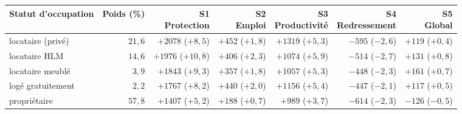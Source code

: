 \begin{tabular}{p{4.2cm}rrrrrr}\toprule Statut d'occupation & Poids (\%) & \makecell{S1\\Protection} & \makecell{S2\\Emploi} & \makecell{S3\\Productivité} & \makecell{S4\\Redressement} & \makecell{S5\\Global}\\ \midrule
locataire (privé) & $21{,}6$ & $+2078$ ($+8{,}5$) & $+452$ ($+1{,}8$) & $+1319$ ($+5{,}3$) & $-595$ ($-2{,}6$) & $+119$ ($+0{,}4$)\\
locataire HLM & $14{,}6$ & $+1976$ ($+10{,}8$) & $+406$ ($+2{,}3$) & $+1074$ ($+5{,}9$) & $-514$ ($-2{,}7$) & $+131$ ($+0{,}8$)\\
locataire meublé & $3{,}9$ & $+1843$ ($+9{,}3$) & $+357$ ($+1{,}8$) & $+1057$ ($+5{,}3$) & $-448$ ($-2{,}3$) & $+161$ ($+0{,}7$)\\
logé gratuitement & $2{,}2$ & $+1767$ ($+8{,}2$) & $+440$ ($+2{,}0$) & $+1156$ ($+5{,}4$) & $-447$ ($-2{,}1$) & $+117$ ($+0{,}5$)\\
propriétaire & $57{,}8$ & $+1407$ ($+5{,}2$) & $+188$ ($+0{,}7$) & $+989$ ($+3{,}7$) & $-614$ ($-2{,}3$) & $-126$ ($-0{,}5$)\\\bottomrule\end{tabular}